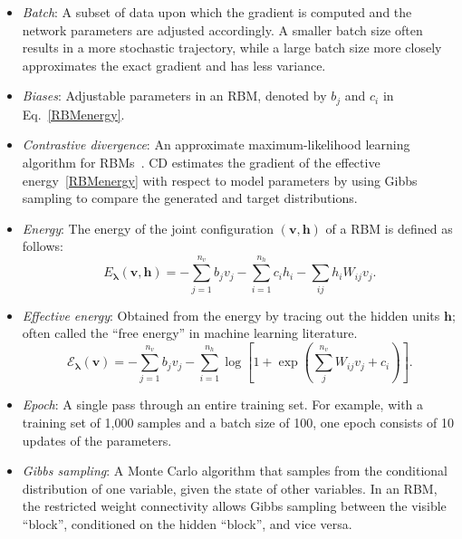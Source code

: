 \documentclass[submission, Phys, hidelnks]{SciPost}
\begin{document}
\begin{itemize}

\item \textit{Batch}: A subset of data upon which the gradient is computed and
the network parameters are adjusted accordingly. A smaller batch size often
results in a more stochastic trajectory, while a large batch size more closely
approximates the exact gradient and has less variance.

\item \textit{Biases}: Adjustable parameters in an RBM, denoted by $b_j$ and
$c_i$ in Eq.~\eqref{RBMenergy}.

\item \textit{Contrastive divergence}: An approximate maximum-likelihood
learning algorithm for RBMs~\cite{hinton_training_2002}. CD estimates the
gradient of the effective energy~\eqref{RBMenergy} with respect to model
parameters by using Gibbs sampling to compare the generated and target
distributions.

\item \textit{Energy}: The energy of the joint configuration $(\bm{v}, \bm{h})$
of a RBM is defined as follows:
\begin{equation}
   E_{\bm{\lambda}}(\bm{v},\bm{h}) = - \sum\limits_{j=1}^{n_v} b_j v_j - \sum\limits_{i=1}^{n_h} c_i h_i - \sum\limits_{ij} h_i W_{ij} v_j. \label{RBMenergy}
\end{equation}

\item \textit{Effective energy}: Obtained from the energy by tracing out the
hidden units $\bm{h}$; often called the ``free energy'' in machine learning
literature.
\begin{equation}
   \mathcal{E}_{\bm{\lambda}}(\bm{v}) = - \sum\limits_{j=1}^{n_v} b_j v_j - \sum\limits_{i=1}^{n_h} \log \left[ 1 + \exp \left( \sum\limits_{j}^{n_v} W_{ij}v_j +c_i\right) \right]. \label{RBMeffectiveenergy}
\end{equation}

\item \textit{Epoch}: A single pass through an entire training set. For example,
with a training set of 1,000 samples and a batch size of 100, one epoch consists
of 10 updates of the parameters.

\item \textit{Gibbs sampling}: A Monte Carlo algorithm that samples from the conditional distribution of one variable, given the state of other variables.
In an RBM, the restricted weight connectivity allows Gibbs sampling between the visible ``block'', conditioned on the hidden ``block'', and vice versa.


\end{itemize}
\end{document}
